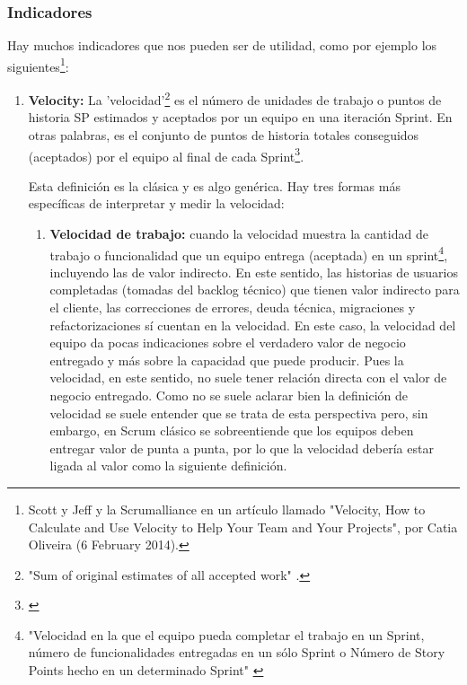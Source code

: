 \subsubsection{Indicadores}

Hay muchos indicadores que nos pueden ser de utilidad, como por ejemplo los siguientes\footnote{Scott y Jeff \cite{Scott-Jeff-2013} y la  Scrumalliance en un artículo llamado "Velocity, How to Calculate and Use Velocity to Help Your Team and Your Projects", por Catia Oliveira (6 February 2014).}:

\begin{enumerate}

\item {\textbf{Velocity:} La 'velocidad'\footnote{"Sum of original estimates of all accepted work" \cite{Scott-Jeff-2013}.} es el número de unidades de trabajo o puntos de historia SP estimados y aceptados por un equipo en una iteración Sprint. En otras palabras, es el conjunto de puntos de historia totales conseguidos (aceptados) por el equipo al final de cada Sprint\footnote{\cite{Jipson-Thomas-2015}}.}

Esta definición es la clásica y es algo genérica. Hay tres formas más específicas de interpretar y medir la velocidad:

  \begin{enumerate}

  \item{\textbf{Velocidad de trabajo:} cuando la velocidad muestra la cantidad de trabajo o funcionalidad que un equipo entrega (aceptada) en un sprint\footnote{"Velocidad en la que el equipo pueda completar el trabajo en un Sprint, número de funcionalidades entregadas en un sólo Sprint o Número de Story Points hecho en un determinado Sprint" \cite{SBOK-2013}}, incluyendo las de valor indirecto. En este sentido, las historias de usuarios completadas (tomadas del backlog técnico) que tienen valor indirecto para el cliente, las correcciones de errores, deuda técnica, migraciones y refactorizaciones sí cuentan en la velocidad. En este caso, la velocidad del equipo da pocas indicaciones sobre el verdadero valor de negocio entregado y más sobre la capacidad que puede producir. Pues la velocidad, en este sentido, no suele tener relación directa con el valor de negocio entregado. Como no se suele aclarar bien la definición de velocidad se suele entender que se trata de esta perspectiva pero, sin embargo, en Scrum clásico se sobreentiende que los equipos deben entregar valor de punta a punta, por lo que la velocidad debería estar ligada al valor como la siguiente definición.
  }


\end{enumerate}
\end{enumerate}
